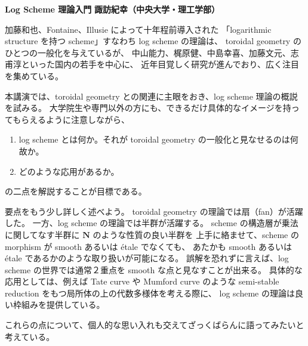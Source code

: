 \documentclass[uplatex,dvipdfmx]{jlreq}
\begin{document}
\newpage

\noindent
{\large\bfseries Log Scheme 理論入門}
\hfill
{\large\bfseries 諏訪紀幸（中央大学・理工学部）}

\bigskip

加藤和也、Fontaine、Illusie によって十年程前導入された
「logarithmic structure を持つ scheme」すなわち log scheme の理論は、
toroidal geometry のひとつの一般化を与えているが、
中山能力、梶原健、中島幸喜、加藤文元、志甫淳といった国内の若手を中心に、
近年目覚しく研究が進んでおり、広く注目を集めている。

本講演では、toroidal geometry との関連に主眼をおき、log scheme 理論の概説を試みる。
大学院生や専門以外の方にも、できるだけ具体的なイメージを持ってもらえるように注意しながら、
\begin{enumerate}
  \setlength{\itemsep}{2pt}
  \item[(1)] log scheme とは何か。それが toroidal geometry の一般化と見なせるのは何故か。
  \item[(2)] どのような応用があるか。
\end{enumerate}
の二点を解説することが目標である。

要点をもう少し詳しく述べよう。
toroidal geometry の理論では扇（fan）が活躍した。
一方、log scheme の理論では半群が活躍する。
scheme の構造層が乗法に関してなす半群に $\mathbf{N}$ のような性質の良い半群を
上手に絡ませて、scheme の morphism が smooth あるいは étale でなくても、
あたかも smooth あるいは étale であるかのような取り扱いが可能になる。
誤解を恐れずに言えば、log scheme の世界では通常２重点を smooth な点と見なすことが出来る。
具体的な応用としては、例えば Tate curve や Mumford curve のような
semi-stable reduction をもつ局所体の上の代数多様体を考える際に、
log scheme の理論は良い枠組みを提供している。

これらの点について、個人的な思い入れも交えてざっくばらんに語ってみたいと考えている。
\end{document}
